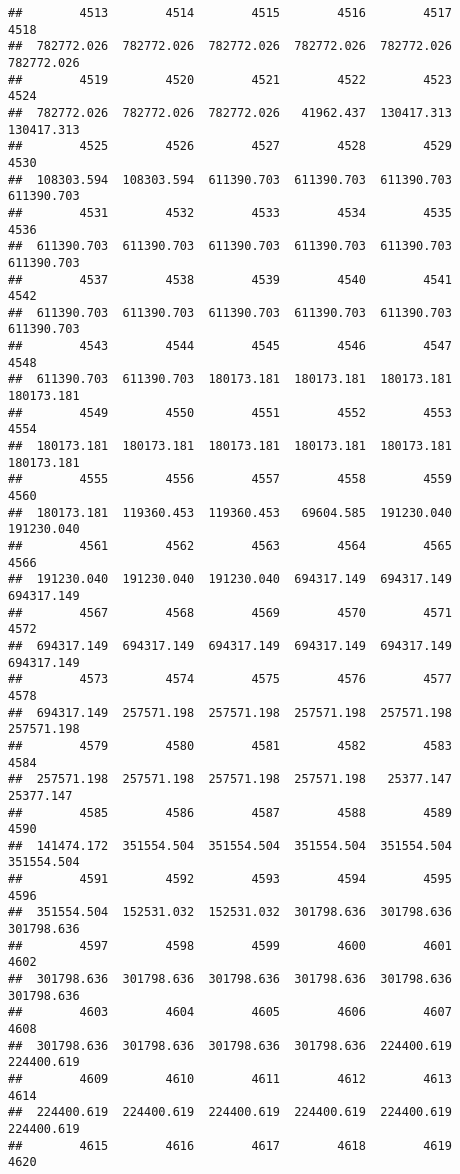\documentclass[
]{book}
\begin{document}
\begin{verbatim}
##        4513        4514        4515        4516        4517        4518 
##  782772.026  782772.026  782772.026  782772.026  782772.026  782772.026 
##        4519        4520        4521        4522        4523        4524 
##  782772.026  782772.026  782772.026   41962.437  130417.313  130417.313 
##        4525        4526        4527        4528        4529        4530 
##  108303.594  108303.594  611390.703  611390.703  611390.703  611390.703 
##        4531        4532        4533        4534        4535        4536 
##  611390.703  611390.703  611390.703  611390.703  611390.703  611390.703 
##        4537        4538        4539        4540        4541        4542 
##  611390.703  611390.703  611390.703  611390.703  611390.703  611390.703 
##        4543        4544        4545        4546        4547        4548 
##  611390.703  611390.703  180173.181  180173.181  180173.181  180173.181 
##        4549        4550        4551        4552        4553        4554 
##  180173.181  180173.181  180173.181  180173.181  180173.181  180173.181 
##        4555        4556        4557        4558        4559        4560 
##  180173.181  119360.453  119360.453   69604.585  191230.040  191230.040 
##        4561        4562        4563        4564        4565        4566 
##  191230.040  191230.040  191230.040  694317.149  694317.149  694317.149 
##        4567        4568        4569        4570        4571        4572 
##  694317.149  694317.149  694317.149  694317.149  694317.149  694317.149 
##        4573        4574        4575        4576        4577        4578 
##  694317.149  257571.198  257571.198  257571.198  257571.198  257571.198 
##        4579        4580        4581        4582        4583        4584 
##  257571.198  257571.198  257571.198  257571.198   25377.147   25377.147 
##        4585        4586        4587        4588        4589        4590 
##  141474.172  351554.504  351554.504  351554.504  351554.504  351554.504 
##        4591        4592        4593        4594        4595        4596 
##  351554.504  152531.032  152531.032  301798.636  301798.636  301798.636 
##        4597        4598        4599        4600        4601        4602 
##  301798.636  301798.636  301798.636  301798.636  301798.636  301798.636 
##        4603        4604        4605        4606        4607        4608 
##  301798.636  301798.636  301798.636  301798.636  224400.619  224400.619 
##        4609        4610        4611        4612        4613        4614 
##  224400.619  224400.619  224400.619  224400.619  224400.619  224400.619 
##        4615        4616        4617        4618        4619        4620 

\end{verbatim}
\end{document}
